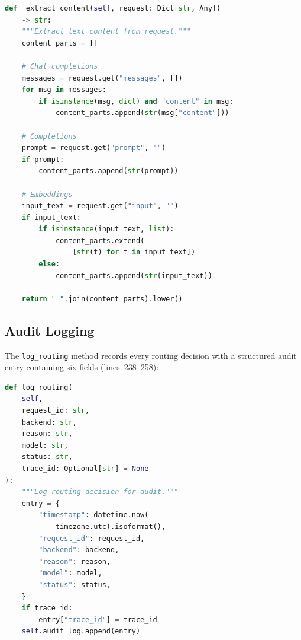 \documentclass[11pt]{article}
\begin{document}
\begin{lstlisting}[language=Python,caption={Content extraction (router.py, lines 172--195)},firstnumber=172]
def _extract_content(self, request: Dict[str, Any])
    -> str:
    """Extract text content from request."""
    content_parts = []

    # Chat completions
    messages = request.get("messages", [])
    for msg in messages:
        if isinstance(msg, dict) and "content" in msg:
            content_parts.append(str(msg["content"]))

    # Completions
    prompt = request.get("prompt", "")
    if prompt:
        content_parts.append(str(prompt))

    # Embeddings
    input_text = request.get("input", "")
    if input_text:
        if isinstance(input_text, list):
            content_parts.extend(
                [str(t) for t in input_text])
        else:
            content_parts.append(str(input_text))

    return " ".join(content_parts).lower()
\end{lstlisting}

\subsection{Audit Logging}

The \texttt{log\_routing} method records every routing decision with a
structured audit entry containing six fields (lines~238--258):

\begin{lstlisting}[language=Python,caption={Audit logging (router.py, lines 238--258)},firstnumber=238]
def log_routing(
    self,
    request_id: str,
    backend: str,
    reason: str,
    model: str,
    status: str,
    trace_id: Optional[str] = None
):
    """Log routing decision for audit."""
    entry = {
        "timestamp": datetime.now(
            timezone.utc).isoformat(),
        "request_id": request_id,
        "backend": backend,
        "reason": reason,
        "model": model,
        "status": status,
    }
    if trace_id:
        entry["trace_id"] = trace_id
    self.audit_log.append(entry)
\end{lstlisting}
\end{document}
